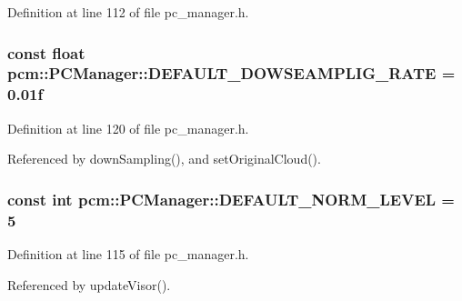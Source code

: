 Definition at line 112 of file pc\-\_\-manager.\-h.

\hypertarget{classpcm_1_1PCManager_a21a35f215779915eda52dbf8d77f1e9f}{
\subsubsection[{D\-E\-F\-A\-U\-L\-T\-\_\-\-D\-O\-W\-S\-E\-A\-M\-P\-L\-I\-G\-\_\-\-R\-A\-T\-E}]{\setlength{\rightskip}{0pt plus 5cm}const float pcm\-::\-P\-C\-Manager\-::\-D\-E\-F\-A\-U\-L\-T\-\_\-\-D\-O\-W\-S\-E\-A\-M\-P\-L\-I\-G\-\_\-\-R\-A\-T\-E = 0.\-01f\hspace{0.3cm}{\ttfamily [static]}}}\label{classpcm_1_1PCManager_a21a35f215779915eda52dbf8d77f1e9f}


Definition at line 120 of file pc\-\_\-manager.\-h.



Referenced by down\-Sampling(), and set\-Original\-Cloud().

\hypertarget{classpcm_1_1PCManager_af4959e1ce5dc2650aab2754472a18ac8}{
\subsubsection[{D\-E\-F\-A\-U\-L\-T\-\_\-\-N\-O\-R\-M\-\_\-\-L\-E\-V\-E\-L}]{\setlength{\rightskip}{0pt plus 5cm}const int pcm\-::\-P\-C\-Manager\-::\-D\-E\-F\-A\-U\-L\-T\-\_\-\-N\-O\-R\-M\-\_\-\-L\-E\-V\-E\-L = 5\hspace{0.3cm}{\ttfamily [static]}}}\label{classpcm_1_1PCManager_af4959e1ce5dc2650aab2754472a18ac8}


Definition at line 115 of file pc\-\_\-manager.\-h.



Referenced by update\-Visor().

